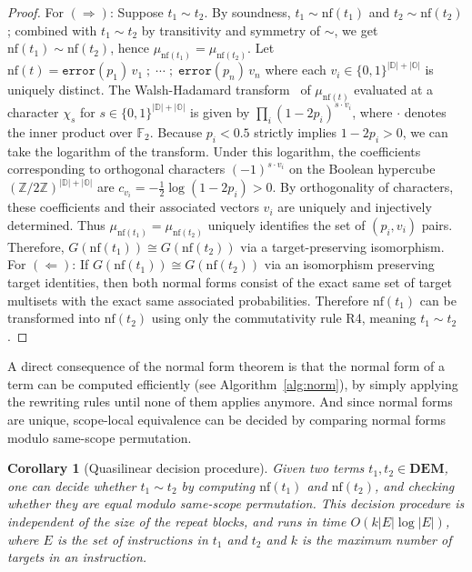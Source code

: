 \documentclass[11pt,a4paper]{article}
\newtheorem{corollary}[theorem]{Corollary}
\newcommand{\nf}[1]{\mathrm{nf}(#1)}  %
\newcommand{\dist}[1]{\mu_{#1}}   %
\begin{document}
\begin{proof}
For $(\Rightarrow)$: Suppose $t_1 \sim t_2$. By soundness, $t_1 \sim \nf{t_1}$ and $t_2 \sim \nf{t_2}$; combined with $t_1 \sim t_2$ by transitivity and symmetry of $\sim$, we get $\nf{t_1} \sim \nf{t_2}$, hence $\dist{\nf{t_1}} = \dist{\nf{t_2}}$. Let $\nf{t} = \mathtt{error}(p_1)\,v_1 \;;\; \cdots \;;\; \mathtt{error}(p_n)\,v_n$ where each $v_i \in \{0,1\}^{|\mathbb{D}|+|\mathbb{O}|}$ is uniquely distinct. The Walsh-Hadamard transform~\cite{macwilliams1977} of $\mu_{\nf{t}}$ evaluated at a character $\chi_s$ for $s \in \{0,1\}^{|\mathbb{D}|+|\mathbb{O}|}$ is given by $\prod_i (1-2p_i)^{s \cdot v_i}$, where $\cdot$ denotes the inner product over $\mathbb{F}_2$. Because $p_i < 0.5$ strictly implies $1-2p_i > 0$, we can take the logarithm of the transform. Under this logarithm, the coefficients corresponding to orthogonal characters $(-1)^{s \cdot v_i}$ on the Boolean hypercube $(\mathbb{Z}/2\mathbb{Z})^{|\mathbb{D}|+|\mathbb{O}|}$ are $c_{v_i} = -\frac{1}{2}\log(1-2p_i) > 0$. By orthogonality of characters, these coefficients and their associated vectors $v_i$ are uniquely and injectively determined. Thus $\dist{\nf{t_1}} = \dist{\nf{t_2}}$ uniquely identifies the set of $(p_i, v_i)$ pairs. Therefore, $G(\nf{t_1}) \cong G(\nf{t_2})$ via a target-preserving isomorphism. 
For $(\Leftarrow)$: If $G(\nf{t_1}) \cong G(\nf{t_2})$ via an isomorphism preserving target identities, then both normal forms consist of the exact same set of target multisets with the exact same associated probabilities. Therefore $\nf{t_1}$ can be transformed into $\nf{t_2}$ using only the commutativity rule R4, meaning $t_1 \sim t_2$.
\end{proof}

A direct consequence of the normal form theorem is that the normal form of a term can be computed efficiently (see Algorithm~\ref{alg:norm}), by simply applying the rewriting rules until none of them applies anymore. And since normal forms are unique, scope-local equivalence can be decided by comparing normal forms modulo same-scope permutation.

\begin{corollary}[Quasilinear decision procedure]
\label{cor:decision}
Given two terms $t_1, t_2 \in \mathbf{DEM}$, one can decide whether $t_1 \sim t_2$ by computing $\nf{t_1}$ and $\nf{t_2}$, and checking whether they are equal modulo same-scope permutation. This decision procedure is independent of the size of the repeat blocks, and runs in time $O(k|E| \log |E|)$, where $E$ is the set of instructions in $t_1$ and $t_2$ and $k$ is the maximum number of targets in an instruction.
\end{corollary}
\end{document}
